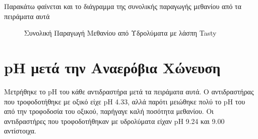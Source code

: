 \documentclass[11pt]{article}
\begin{document}
Παρακάτω φαίνεται και το διάγραμμα της συνολικής παραγωγής μεθανίου από τα πειράματα αυτά

\begin{figure}[htbp]
\centering

\caption{Συνολική Παραγωγή Μεθανίου από Υδρολύματα με λάσπη Tasty}
\end{figure}

\section{pH μετά την Αναερόβια Χώνευση}
\label{sec:orgc2c7aec}
Μετρήθηκε το pH του κάθε αντιδραστήρα μετά τα πειράματα αυτά. Ο αντιδραστήρας που τροφοδοτήθηκε με οξικό είχε pH 4.33, αλλά παρότι μειώθηκε πολύ το pH του από την τροφοδοσία του οξικού, παρήγαγε καλή ποσότητα μεθανίου. Οι αντιδραστήρες που τροφοδοτήθηκαν με υδρολύματα είχαν pH 9.24 και 9.00 αντίστοιχα.
\end{document}
